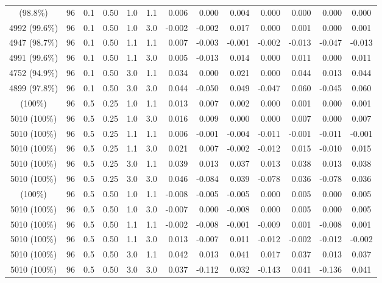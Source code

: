 \begin{longtable}[t]{ccccccrrrrrrc}
\addlinespace
4950 (98.8\%) & 96 & 0.1 & 0.50 & 1.0 & 1.1 & 0.006 & 0.000 & 0.004 & 0.000 & 0.000 & 0.000 & 0.000\\
4992 (99.6\%) & 96 & 0.1 & 0.50 & 1.0 & 3.0 & -0.002 & -0.002 & 0.017 & 0.000 & 0.001 & 0.000 & 0.001\\
4947 (98.7\%) & 96 & 0.1 & 0.50 & 1.1 & 1.1 & 0.007 & -0.003 & -0.001 & -0.002 & -0.013 & -0.047 & -0.013\\
4991 (99.6\%) & 96 & 0.1 & 0.50 & 1.1 & 3.0 & 0.005 & -0.013 & 0.014 & 0.000 & 0.011 & 0.000 & 0.011\\
4752 (94.9\%) & 96 & 0.1 & 0.50 & 3.0 & 1.1 & 0.034 & 0.000 & 0.021 & 0.000 & 0.044 & 0.013 & 0.044\\
4899 (97.8\%) & 96 & 0.1 & 0.50 & 3.0 & 3.0 & 0.044 & -0.050 & 0.049 & -0.047 & 0.060 & -0.045 & 0.060\\
\addlinespace
5010 (100\%) & 96 & 0.5 & 0.25 & 1.0 & 1.1 & 0.013 & 0.007 & 0.002 & 0.000 & 0.001 & 0.000 & 0.001\\
5010 (100\%) & 96 & 0.5 & 0.25 & 1.0 & 3.0 & 0.016 & 0.009 & 0.000 & 0.000 & 0.007 & 0.000 & 0.007\\
5010 (100\%) & 96 & 0.5 & 0.25 & 1.1 & 1.1 & 0.006 & -0.001 & -0.004 & -0.011 & -0.001 & -0.011 & -0.001\\
5010 (100\%) & 96 & 0.5 & 0.25 & 1.1 & 3.0 & 0.021 & 0.007 & -0.002 & -0.012 & 0.015 & -0.010 & 0.015\\
5010 (100\%) & 96 & 0.5 & 0.25 & 3.0 & 1.1 & 0.039 & 0.013 & 0.037 & 0.013 & 0.038 & 0.013 & 0.038\\
5010 (100\%) & 96 & 0.5 & 0.25 & 3.0 & 3.0 & 0.046 & -0.084 & 0.039 & -0.078 & 0.036 & -0.078 & 0.036\\
\addlinespace
5010 (100\%) & 96 & 0.5 & 0.50 & 1.0 & 1.1 & -0.008 & -0.005 & -0.005 & 0.000 & 0.005 & 0.000 & 0.005\\
5010 (100\%) & 96 & 0.5 & 0.50 & 1.0 & 3.0 & -0.007 & 0.000 & -0.008 & 0.000 & 0.005 & 0.000 & 0.005\\
5010 (100\%) & 96 & 0.5 & 0.50 & 1.1 & 1.1 & -0.002 & -0.008 & -0.001 & -0.009 & 0.001 & -0.008 & 0.001\\
5010 (100\%) & 96 & 0.5 & 0.50 & 1.1 & 3.0 & 0.013 & -0.007 & 0.011 & -0.012 & -0.002 & -0.012 & -0.002\\
5010 (100\%) & 96 & 0.5 & 0.50 & 3.0 & 1.1 & 0.042 & 0.013 & 0.041 & 0.017 & 0.037 & 0.013 & 0.037\\
5010 (100\%) & 96 & 0.5 & 0.50 & 3.0 & 3.0 & 0.037 & -0.112 & 0.032 & -0.143 & 0.041 & -0.136 & 0.041\\
\bottomrule
\end{longtable}
\endgroup{}
